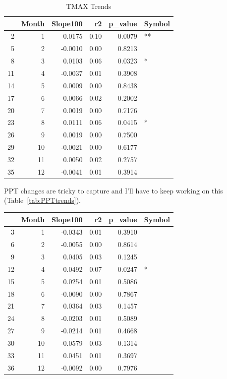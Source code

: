 \documentclass{article}\usepackage[]{graphicx}\usepackage[]{color}
\begin{document}
\begin{table}[ht]
\centering
\begin{tabular}{rrrrrl}
  \hline
 & Month & Slope100 & r2 & p\_value & Symbol \\ 
  \hline
2 & 1 & 0.0175 & 0.10 & 0.0079 & ** \\ 
  5 & 2 & -0.0010 & 0.00 & 0.8213 &  \\ 
  8 & 3 & 0.0103 & 0.06 & 0.0323 & * \\ 
  11 & 4 & -0.0037 & 0.01 & 0.3908 &  \\ 
  14 & 5 & 0.0009 & 0.00 & 0.8438 &  \\ 
  17 & 6 & 0.0066 & 0.02 & 0.2002 &  \\ 
  20 & 7 & 0.0019 & 0.00 & 0.7176 &  \\ 
  23 & 8 & 0.0111 & 0.06 & 0.0415 & * \\ 
  26 & 9 & 0.0019 & 0.00 & 0.7500 &  \\ 
  29 & 10 & -0.0021 & 0.00 & 0.6177 &  \\ 
  32 & 11 & 0.0050 & 0.02 & 0.2757 &  \\ 
  35 & 12 & -0.0041 & 0.01 & 0.3914 &  \\ 
   \hline
\end{tabular}
\caption{TMAX Trends} 
\end{table}


PPT changes are tricky to capture and I'll have to keep working on this (Table~\ref{tab:PPTtrends}).

\begin{table}[ht]
\centering
\begin{tabular}{rrrrrl}
  \hline
 & Month & Slope100 & r2 & p\_value & Symbol \\ 
  \hline
3 & 1 & -0.0343 & 0.01 & 0.3910 &  \\ 
  6 & 2 & -0.0055 & 0.00 & 0.8614 &  \\ 
  9 & 3 & 0.0405 & 0.03 & 0.1245 &  \\ 
  12 & 4 & 0.0492 & 0.07 & 0.0247 & * \\ 
  15 & 5 & 0.0254 & 0.01 & 0.5086 &  \\ 
  18 & 6 & -0.0090 & 0.00 & 0.7867 &  \\ 
  21 & 7 & 0.0364 & 0.03 & 0.1457 &  \\ 
  24 & 8 & -0.0203 & 0.01 & 0.5089 &  \\ 
  27 & 9 & -0.0214 & 0.01 & 0.4668 &  \\ 
  30 & 10 & -0.0579 & 0.03 & 0.1314 &  \\ 
  33 & 11 & 0.0451 & 0.01 & 0.3697 &  \\ 
  36 & 12 & -0.0092 & 0.00 & 0.7976 &  \\ 
   \hline
\end{tabular}
\end{table}
\end{document}
